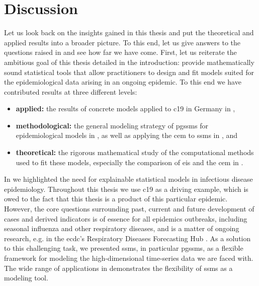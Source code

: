 \chapter{Discussion}
\label{cha:discussion}
\glsresetall

Let us look back on the insights gained in this thesis and put the theoretical and applied results into a broader picture. To this end, let us give answers to the questions raised in  and see how far we have come. First, let us reiterate the ambitious goal of this thesis detailed in the introduction: provide mathematically sound statistical tools that allow practitioners to design and fit models suited for the epidemiological data arising in an ongoing epidemic. To this end we have contributed results at three different levels:
\begin{itemize}
    \item \textbf{applied:} the results of concrete models applied to \gls{c19} in Germany in ,
    \item \textbf{methodological:} the general modeling strategy of \glspl{pgssm} for epidemiological models in , as well as applying the \gls{cem} to \glspl{ssm} in , and
    \item \textbf{theoretical:} the rigorous mathematical study of the computational methods used to fit these models, especially the comparison of \gls{eis} and the \gls{cem} in .
\end{itemize}

In  we highlighted the need for explainable statistical models in infectious disease epidemiology. Throughout this thesis we use \gls{c19} as a driving example, which is owed to the fact that this thesis is a product of this particular epidemic. However, the core questions surrounding past, current and future development of cases and derived indicators is of essence for all epidemics outbreaks, including seasonal influenza and other respiratory diseases, and is a matter of ongoing research, e.g. in the \gls{ecdc}'s Respiratory Diseases Forecasting Hub \citep{ECDCRespiCast}. As a solution to this challenging task, we presented \glspl{ssm}, in particular \glspl{pgssm}, as a flexible framework for modeling the high-dimensional time-series data we are faced with. The wide range of applications in  demonstrates the flexibility of \glspl{ssm} as a modeling tool. 

